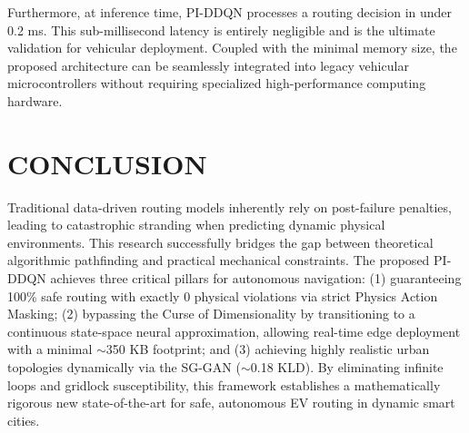 \documentclass[journal, a4paper, twocolumn]{IEEEtran}
\begin{document}
Furthermore, at inference time, PI-DDQN processes a routing decision in under 0.2 ms. This sub-millisecond latency is entirely negligible and is the ultimate validation for vehicular deployment. Coupled with the minimal memory size, the proposed architecture can be seamlessly integrated into legacy vehicular microcontrollers without requiring specialized high-performance computing hardware.

\section{CONCLUSION}
\label{sec:conclusion}
Traditional data-driven routing models inherently rely on post-failure penalties, leading to catastrophic stranding when predicting dynamic physical environments. This research successfully bridges the gap between theoretical algorithmic pathfinding and practical mechanical constraints. The proposed PI-DDQN achieves three critical pillars for autonomous navigation: (1) guaranteeing 100\% safe routing with exactly 0 physical violations via strict Physics Action Masking; (2) bypassing the Curse of Dimensionality by transitioning to a continuous state-space neural approximation, allowing real-time edge deployment with a minimal $\sim$350 KB footprint; and (3) achieving highly realistic urban topologies dynamically via the SG-GAN ($\sim$0.18 KLD). By eliminating infinite loops and gridlock susceptibility, this framework establishes a mathematically rigorous new state-of-the-art for safe, autonomous EV routing in dynamic smart cities.
\end{document}
